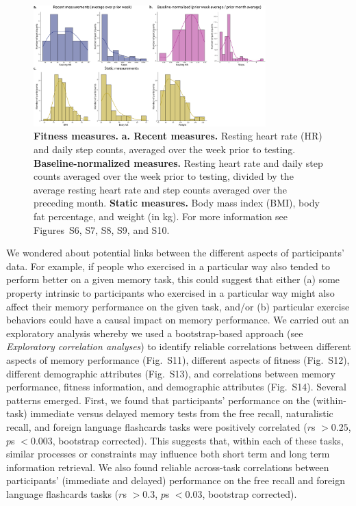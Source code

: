 \documentclass[10pt]{article}
\newcommand{\fitDists}{S6}
\newcommand{\fitDistgridImmediate}{S7}
\newcommand{\fitScatterImmediate}{S8}
\newcommand{\fitDistgridDelayed}{S9}
\newcommand{\fitScatterDelayed}{S10}
\newcommand{\behBehCorr}{S11}
\newcommand{\fitFitCorr}{S12}
\newcommand{\demDemCorr}{S13}
\newcommand{\allCorr}{S14}
\begin{document}
\begin{figure}[tp]
\centering
\includegraphics[width=0.8\textwidth]{figs/fitness_distributions_summary}
\caption{\textbf{Fitness measures.}  \textbf{a. Recent measures.}
  Resting heart rate (HR) and daily step counts, averaged over the
  week prior to testing.  \textbf{Baseline-normalized measures.}
  Resting heart rate and daily step counts averaged over the week
  prior to testing, divided by the average resting heart rate and step
counts averaged over the preceding month.  \textbf{Static measures.}
Body mass index (BMI), body fat percentage, and weight (in kg).  For
more information see Figures~\fitDists, \fitDistgridImmediate,
\fitScatterImmediate, \fitDistgridDelayed, and \fitScatterDelayed.}
\label{fig:fitness_summary}
\end{figure}

We wondered about potential links between the different aspects of
participants' data.  For example, if people who exercised in a
particular way also tended to perform better on a given memory task,
this could suggest that either (a) some property intrinsic to participants who
exercised in a particular way might also affect their memory
performance on the given task, and/or (b) particular exercise behaviors
could have a causal impact on memory performance.  We carried out an
exploratory analysis whereby we used a bootstrap-based approach (see
\textit{Exploratory correlation analyses}) to
identify reliable correlations between different aspects of memory
performance (Fig.~\behBehCorr), different aspects of fitness (Fig.~\fitFitCorr), different demographic
attributes (Fig.~\demDemCorr), and correlations between memory
performance, fitness information, and demographic attributes
(Fig.~\allCorr).  Several patterns emerged.  First, we found that
participants' performance on the (within-task) immediate versus delayed memory tests
from the free recall, naturalistic recall, and foreign language
flashcards tasks were positively correlated ($r$s $> 0.25$, $p$s $< 0.003$,
bootstrap corrected).  This suggests that, within each of these tasks,
similar processes or constraints may influence both short term and
long term information retrieval.  We also found reliable across-task correlations
between participants' (immediate and delayed) performance on the free
recall and foreign language flashcards tasks ($r$s $> 0.3$, $p$s $< 0.03$,
bootstrap corrected).
\end{document}
